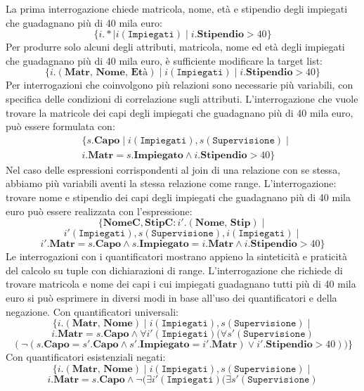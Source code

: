 \documentclass[12pt]{report}
\begin{document}
 	La prima interrogazione chiede matricola, nome, età e stipendio degli impiegati che guadagnano più di 40 mila euro:
 	\[
 	\{i.* \mid i(\texttt{Impiegati}) \mid i.\textbf{Stipendio} > 40\}
 	\]
 	Per produrre solo alcuni degli attributi, matricola, nome ed età degli impiegati che guadagnano più di 40 mila euro, è sufficiente modificare la target list:
 	\[
 	\{i.(\textbf{Matr, Nome, Età}) \mid i(\texttt{Impiegati}) \mid i.\textbf{Stipendio} > 40\}
  	\]
  	Per interrogazioni che coinvolgono più relazioni sono necessarie più variabili, con specifica delle condizioni di correlazione sugli attributi. L'interrogazione che vuole trovare la matricole dei capi degli impiegati che guadagnano più di 40 mila euro, può essere formulata con:
  	\begin{align*}
  		&\{s.\textbf{Capo} \mid i(\texttt{Impiegati}), s(\texttt{Supervisione}) \mid \\
  		& i.\textbf{Matr} = s.\textbf{Impiegato} \wedge i.\textbf{Stipendio} > 40\}
  	\end{align*}
  	Nel caso delle espressioni corrispondenti al join di una relazione con se stessa, abbiamo più variabili aventi la stessa relazione come range. L'interrogazione: trovare nome e stipendio dei capi degli impiegati che guadagnano più di 40 mila euro può essere realizzata con l'espressione:
  	\[
  	\{\textbf{NomeC}, \textbf{StipC} : i'.(\textbf{Nome, Stip}) \mid
  	\]
  	\[
  	i'(\texttt{Impiegati}), s(\texttt{Supervisione}), i(\texttt{Impiegati}) \mid
  	\]
  	\[
  	i'.\textbf{Matr} = s.\textbf{Capo} \wedge s.\textbf{Impiegato} = i.\textbf{Matr} \wedge i.\textbf{Stipendio} > 40\}
  	\]
  	Le interrogazioni con i quantificatori mostrano appieno la sinteticità e praticità del calcolo su tuple con dichiarazioni di range. L'interrogazione che richiede di trovare matricola e nome dei capi i cui impiegati guadagnano tutti più di 40 mila euro si può esprimere in diversi modi in base all'uso dei quantificatori e della negazione. Con quantificatori universali:
  	\[
  	\{i.(\textbf{Matr, Nome}) \mid i(\texttt{Impiegati}), s(\texttt{Supervisione}) \mid
  	\]
  	\[
  	i.\textbf{Matr} = s.\textbf{Capo} \wedge \forall i'(\texttt{Impiegati})(\forall s'(\texttt{Supervisione})
  	\]
  	\[
  	(\neg(s.\textbf{Capo} = s'.\textbf{Capo} \wedge s'.\textbf{Impiegato} = i'.\textbf{Matr}) \vee i'.\textbf{Stipendio} > 40))\}
  	\]
  	Con quantificatori esistenziali negati:
  	\[
  	\{i.(\textbf{Matr, Nome}) \mid i(\texttt{Impiegati}), s(\texttt{Supervisione}) \mid
  	\]
  	\[
  	i.\textbf{Matr} = s.\textbf{Capo} \wedge \neg(\exists i'(\texttt{Impiegati})(\exists s'(\texttt{Supervisione})
  	\]
\end{document}

